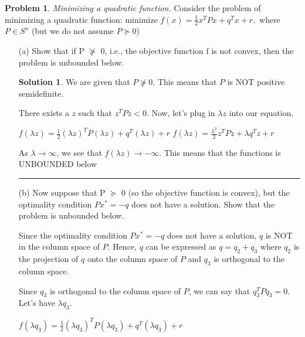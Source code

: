 \documentclass{article}
\theoremstyle{definition}
\newtheorem{problem}{Problem}
\def\fline{\rule{0.75\linewidth}{0.5pt}}
\newcommand{\finishline}{\begin{center}\fline\end{center}}
\newtheorem*{solution*}{Solution}
\newenvironment{solution}{\begin{solution*}}{{\finishline} \end{solution*}}
\begin{document}
\begin{problem}
\textit{Minimizing a quadratic function.} Consider the problem of minimizing a quadratic function: \newline 
minimize $f(x) = \frac{1}{2} x^TPx + q^Tx + r,$ \newline 
where $P \in S^n$ (but we do not assume $P \succcurlyeq 0$)

\begin{enumerate}
    \item[(a)] Show that if P $\not\succcurlyeq$ 0, i.e., the objective function f is not convex, then the problem is unbounded below.

    \begin{solution}
        We are given that $P \not\succcurlyeq 0$. This means that $P$ is NOT positive semidefinite. \newline 

        There exists a $z$ such that $z^TPz < 0$. Now, let's plug in $\lambda z$ into our equation. 

        $f(\lambda z) = \frac{1}{2} (\lambda z)^TP(\lambda z) + q^T(\lambda z) + r$
        $f(\lambda z) = \frac{\lambda^2}{2} z^TPz + \lambda q^Tz + r$ \newline 

        As $\lambda \rightarrow \infty$, we see that $f(\lambda z) \rightarrow -\infty$. This means that the functions is UNBOUNDED below 

    \end{solution}

    \item[(b)] Now suppose that P $\succcurlyeq$ 0 (so the objective function is convex), but the optimality condition $Px^* = -q$ does not have a solution. Show that the problem is unbounded below. \newline 

    Since the optimality condition $Px^* = -q$ does not have a solution, $q$ is NOT in the column space of $P$. Hence, $q$ can be expressed as $q = q_2 + q_3$ where $q_2$ is the projection of $q$ onto the column space of $P$ and $q_3$ is orthogonal to the column space. \newline 


    Since $q_3$ is orthogonal to the column space of $P$, we can say that $q_3^TPq_3 = 0$. Let's have $\lambda q_3$. 

    $f(\lambda q_3) = \frac{1}{2} (\lambda q_3)^TP(\lambda q_3) + q^T(\lambda q_3) + r$ \newline 


\end{enumerate}
\end{problem}
\end{document}
